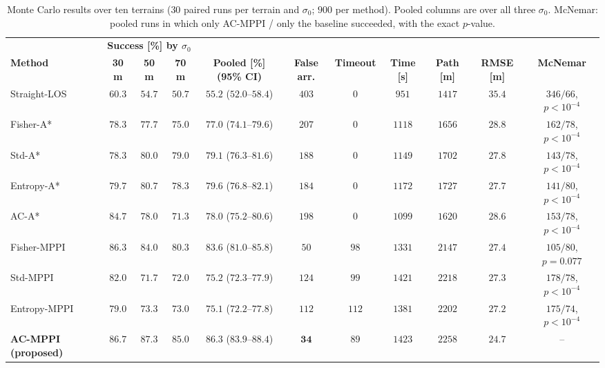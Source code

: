 \documentclass[letterpaper, 10 pt, journal, twoside]{IEEEtran}
\begin{document}
\begin{table}
  \centering
  \caption{Monte Carlo results over ten terrains ($30$ paired runs per terrain and $\sigma_0$; $900$ per method). Pooled columns are over all three $\sigma_0$. McNemar: pooled runs in which only AC-MPPI / only the baseline succeeded, with the exact $p$-value.}
  \footnotesize
  \setlength{\tabcolsep}{4.2pt}
  \begin{tabular}{l c c c c c c c c c c}
    \hline
    & \multicolumn{3}{c}{\textbf{Success [\%] by $\sigma_0$}} & & & & & & & \\
    \textbf{Method} & \textbf{30 m} & \textbf{50 m} & \textbf{70 m} & \textbf{Pooled [\%] (95\% CI)} & \textbf{False arr.} & \textbf{Timeout} & \textbf{Time [s]} & \textbf{Path [m]} & \textbf{RMSE [m]} & \textbf{McNemar} \\
    \hline
    Straight-LOS  & $60.3$ & $54.7$ & $50.7$ & $55.2$ ($52.0$--$58.4$) & $403$ & $0$   & $951$  & $1417$ & $35.4$ & $346/66$, $p < 10^{-4}$ \\
    Fisher-A*     & $78.3$ & $77.7$ & $75.0$ & $77.0$ ($74.1$--$79.6$) & $207$ & $0$   & $1118$ & $1656$ & $28.8$ & $162/78$, $p < 10^{-4}$ \\
    Std-A*        & $78.3$ & $80.0$ & $79.0$ & $79.1$ ($76.3$--$81.6$) & $188$ & $0$   & $1149$ & $1702$ & $27.8$ & $143/78$, $p < 10^{-4}$ \\
    Entropy-A*    & $79.7$ & $80.7$ & $78.3$ & $79.6$ ($76.8$--$82.1$) & $184$ & $0$   & $1172$ & $1727$ & $27.7$ & $141/80$, $p < 10^{-4}$ \\
    AC-A*         & $84.7$ & $78.0$ & $71.3$ & $78.0$ ($75.2$--$80.6$) & $198$ & $0$   & $1099$ & $1620$ & $28.6$ & $153/78$, $p < 10^{-4}$ \\
    Fisher-MPPI   & $86.3$ & $84.0$ & $80.3$ & $83.6$ ($81.0$--$85.8$) & $50$  & $98$  & $1331$ & $2147$ & $27.4$ & $105/80$, $p = 0.077$ \\
    Std-MPPI      & $82.0$ & $71.7$ & $72.0$ & $75.2$ ($72.3$--$77.9$) & $124$ & $99$  & $1421$ & $2218$ & $27.3$ & $178/78$, $p < 10^{-4}$ \\
    Entropy-MPPI  & $79.0$ & $73.3$ & $73.0$ & $75.1$ ($72.2$--$77.8$) & $112$ & $112$ & $1381$ & $2202$ & $27.2$ & $175/74$, $p < 10^{-4}$ \\
    \textbf{AC-MPPI (proposed)} & $\mathbf{86.7}$ & $\mathbf{87.3}$ & $\mathbf{85.0}$ & $\mathbf{86.3}$ ($83.9$--$88.4$) & $\mathbf{34}$ & $89$ & $1423$ & $2258$ & $\mathbf{24.7}$ & -- \\
    \hline
  \end{tabular}
  \label{tab:overall}
  \vspace{-10pt}
\end{table}
\end{document}
